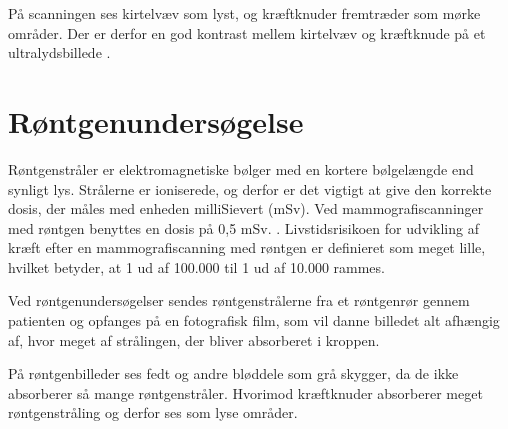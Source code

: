 På scanningen ses kirtelvæv som lyst, og kræftknuder fremtræder som mørke områder.  Der er derfor en god kontrast mellem kirtelvæv og kræftknude på et ultralydsbillede \citep{Ultralyd}.

\section{Røntgenundersøgelse}
Røntgenstråler er elektromagnetiske bølger med en kortere bølgelængde end synligt lys. Strålerne er ioniserede, og derfor er det vigtigt at give den korrekte dosis, der måles med enheden milliSievert (mSv). Ved mammografiscanninger med røntgen benyttes en dosis på 0,5 mSv. \cite{Sundhedsstyrelsen}. Livstidsrisikoen for udvikling af kræft efter en mammografiscanning med røntgen er definieret som meget lille, hvilket betyder, at 1 ud af 100.000 til 1 ud af 10.000 rammes. 

Ved røntgenundersøgelser sendes røntgenstrålerne fra et røntgenrør gennem patienten og opfanges på en fotografisk film, som vil danne billedet alt afhængig af, hvor meget af strålingen, der bliver absorberet i kroppen. 

På røntgenbilleder ses fedt og andre bløddele som grå skygger, da de ikke absorberer så mange røntgenstråler. Hvorimod kræftknuder absorberer meget røntgenstråling og derfor ses som lyse områder. \cite{Rontgenundersogelse}

